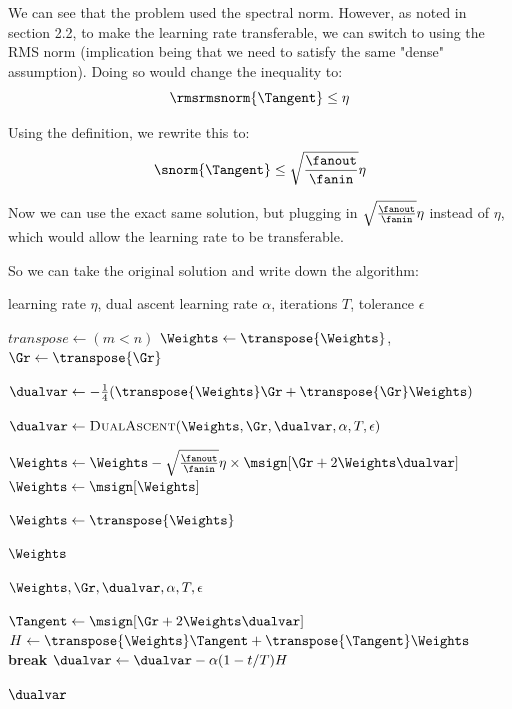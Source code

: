 \documentclass[12pt]{article}
\begin{document}
We can see that the problem used the spectral norm. However, as noted in section 2.2, to make the learning rate transferable, we can switch to using the RMS norm (implication being that we need to satisfy the same "dense" assumption). Doing so would change the inequality to:
\[\rmsrmsnorm{\Tangent} \le \eta\]

Using the definition, we rewrite this to:
\[\snorm{\Tangent} \le \sqrt{\frac{\fanout}{\fanin}}\eta\]

Now we can use the exact same solution, but plugging in $\sqrt{\frac{\fanout}{\fanin}}\eta$ instead of $\eta$, which would allow the learning rate to be transferable. 

So we can take the original solution and write down the algorithm:

\begin{algorithm}[t]
\caption{Vanilla Manifold Muon Update}
\label{alg:manifold_muon}
\begin{algorithmic}[1]
\Require learning rate $\eta$, dual ascent learning rate $\alpha$, iterations $T$, tolerance $\epsilon$

\State $transpose \gets (m < n)$
    \State $\Weights \gets \transpose{\Weights}$, $\Gr \gets \transpose{\Gr}$
\EndIf

\State $\dualvar \gets -\frac14 (\transpose{\Weights} \Gr + \transpose{\Gr} \Weights)$

\State $\dualvar \gets \textsc{DualAscent}(\Weights, \Gr, \dualvar, \alpha, T, \epsilon)$

\State $\Weights \gets \Weights - \sqrt{\frac{\fanout}{\fanin}}\eta \times \msign[\Gr + 2\Weights\dualvar]$
\State $\Weights \gets \msign[\Weights]$

    \State $\Weights \gets \transpose{\Weights}$
\EndIf

\State \Return $\Weights$
\end{algorithmic}
\end{algorithm}

\begin{algorithm}[t]
\caption{Dual Ascent (for Vanilla Manifold Muon)}
\label{alg:dual_ascent_manifold_muon}
\begin{algorithmic}[1]
\Require $\Weights, \Gr, \dualvar, \alpha, T, \epsilon$

    \State $\Tangent \gets \msign[\Gr + 2\Weights\dualvar]$
    \State $H \gets \transpose{\Weights} \Tangent + \transpose{\Tangent} \Weights$
        \State \textbf{break}
    \EndIf
    \State $\dualvar \gets \dualvar - \alpha (1 - t/T) H$
\EndFor

\State \Return $\dualvar$
\end{algorithmic}
\end{algorithm}
\end{document}
